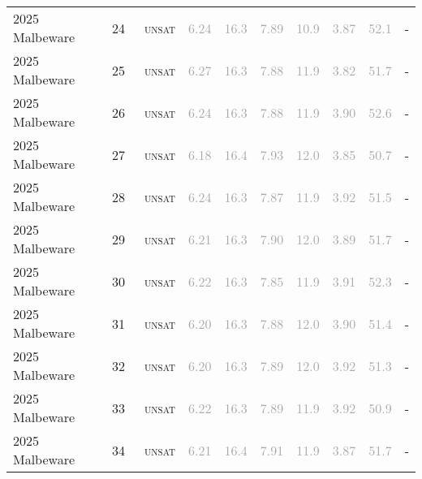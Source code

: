 \begin{center}
{\begin{longtable}{@{}llllllllll@{}}
2025 Malbeware & 24 & ~\textsc{unsat} & \textcolor{darkgray}{6.24} & \textcolor{darkgray}{16.3} & \textcolor{darkgray}{7.89} & \textcolor{darkgray}{10.9} & \textcolor{darkgray}{3.87} & \textcolor{darkgray}{52.1} & - \\
2025 Malbeware & 25 & ~\textsc{unsat} & \textcolor{darkgray}{6.27} & \textcolor{darkgray}{16.3} & \textcolor{darkgray}{7.88} & \textcolor{darkgray}{11.9} & \textcolor{darkgray}{3.82} & \textcolor{darkgray}{51.7} & - \\
2025 Malbeware & 26 & ~\textsc{unsat} & \textcolor{darkgray}{6.24} & \textcolor{darkgray}{16.3} & \textcolor{darkgray}{7.88} & \textcolor{darkgray}{11.9} & \textcolor{darkgray}{3.90} & \textcolor{darkgray}{52.6} & - \\
2025 Malbeware & 27 & ~\textsc{unsat} & \textcolor{darkgray}{6.18} & \textcolor{darkgray}{16.4} & \textcolor{darkgray}{7.93} & \textcolor{darkgray}{12.0} & \textcolor{darkgray}{3.85} & \textcolor{darkgray}{50.7} & - \\
2025 Malbeware & 28 & ~\textsc{unsat} & \textcolor{darkgray}{6.24} & \textcolor{darkgray}{16.3} & \textcolor{darkgray}{7.87} & \textcolor{darkgray}{11.9} & \textcolor{darkgray}{3.92} & \textcolor{darkgray}{51.5} & - \\
2025 Malbeware & 29 & ~\textsc{unsat} & \textcolor{darkgray}{6.21} & \textcolor{darkgray}{16.3} & \textcolor{darkgray}{7.90} & \textcolor{darkgray}{12.0} & \textcolor{darkgray}{3.89} & \textcolor{darkgray}{51.7} & - \\
2025 Malbeware & 30 & ~\textsc{unsat} & \textcolor{darkgray}{6.22} & \textcolor{darkgray}{16.3} & \textcolor{darkgray}{7.85} & \textcolor{darkgray}{11.9} & \textcolor{darkgray}{3.91} & \textcolor{darkgray}{52.3} & - \\
2025 Malbeware & 31 & ~\textsc{unsat} & \textcolor{darkgray}{6.20} & \textcolor{darkgray}{16.3} & \textcolor{darkgray}{7.88} & \textcolor{darkgray}{12.0} & \textcolor{darkgray}{3.90} & \textcolor{darkgray}{51.4} & - \\
2025 Malbeware & 32 & ~\textsc{unsat} & \textcolor{darkgray}{6.20} & \textcolor{darkgray}{16.3} & \textcolor{darkgray}{7.89} & \textcolor{darkgray}{12.0} & \textcolor{darkgray}{3.92} & \textcolor{darkgray}{51.3} & - \\
2025 Malbeware & 33 & ~\textsc{unsat} & \textcolor{darkgray}{6.22} & \textcolor{darkgray}{16.3} & \textcolor{darkgray}{7.89} & \textcolor{darkgray}{11.9} & \textcolor{darkgray}{3.92} & \textcolor{darkgray}{50.9} & - \\
2025 Malbeware & 34 & ~\textsc{unsat} & \textcolor{darkgray}{6.21} & \textcolor{darkgray}{16.4} & \textcolor{darkgray}{7.91} & \textcolor{darkgray}{11.9} & \textcolor{darkgray}{3.87} & \textcolor{darkgray}{51.7} & - \\

\end{longtable}}
\end{center}
